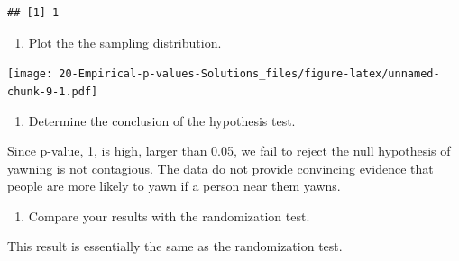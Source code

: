 \documentclass[
]{book}
\newenvironment{Shaded}{\begin{snugshade}}{\end{snugshade}}
\newcommand{\DataTypeTok}[1]{\textcolor[rgb]{0.13,0.29,0.53}{#1}}
\newcommand{\DecValTok}[1]{\textcolor[rgb]{0.00,0.00,0.81}{#1}}
\newcommand{\KeywordTok}[1]{\textcolor[rgb]{0.13,0.29,0.53}{\textbf{#1}}}
\newcommand{\NormalTok}[1]{#1}
\newcommand{\OperatorTok}[1]{\textcolor[rgb]{0.81,0.36,0.00}{\textbf{#1}}}
\newcommand{\StringTok}[1]{\textcolor[rgb]{0.31,0.60,0.02}{#1}}
\providecommand{\tightlist}{%
  \setlength{\itemsep}{0pt}\setlength{\parskip}{0pt}}
\begin{document}
\begin{verbatim}
## [1] 1
\end{verbatim}

\begin{enumerate}
\def\labelenumi{\alph{enumi}.}
\setcounter{enumi}{3}
\tightlist
\item
  Plot the the sampling distribution.
\end{enumerate}

\begin{Shaded}
\end{Shaded}

\texttt{[image: 20-Empirical-p-values-Solutions\_files/figure-latex/unnamed-chunk-9-1.pdf]}

\begin{enumerate}
\def\labelenumi{\alph{enumi}.}
\setcounter{enumi}{4}
\tightlist
\item
  Determine the conclusion of the hypothesis test.
\end{enumerate}

Since p-value, 1, is high, larger than 0.05, we fail to reject the null hypothesis of yawning is not contagious. The data do not provide convincing evidence that people are more likely to yawn if a person near them yawns.

\begin{enumerate}
\def\labelenumi{\alph{enumi}.}
\setcounter{enumi}{5}
\tightlist
\item
  Compare your results with the randomization test.
\end{enumerate}

This result is essentially the same as the randomization test.
\end{document}
